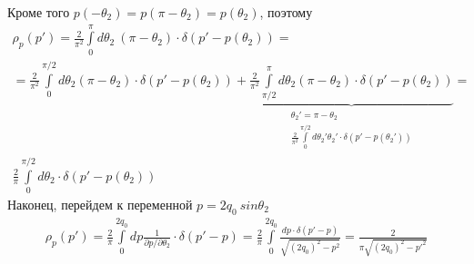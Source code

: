 \documentclass[12pt]{article}
\renewcommand{\l}{\left( }
\renewcommand{\r}{\right) }
\newcommand{\pd}{\partial}
\newcommand{\br}[1]{\l {#1} \r}
\begin{document}
Кроме того $p\br{-\theta_2} = p\br{\pi - \theta_2} = p\br{\theta_2}$, поэтому
\begin{gather}
\rho_p \br{p'} = \frac{2}{\pi^2} \int\limits_0^\pi d\theta_2 \ \br{\pi - \theta_2} \cdot \delta \br{p' - p \br{\theta_2}} = \nonumber \\
= \frac{2}{\pi^2} \int\limits_0^{\pi/2} d\theta_2 \br{\pi - \theta_2} \cdot \delta \br{p' - p \br{\theta_2}} + 
\underbrace{\frac{2}{\pi^2}\int\limits_{\pi/2}^\pi d\theta_2 \br{\pi - \theta_2} \cdot \delta \br{p' - p \br{\theta_2}} }_{
\begin{matrix}
\theta_2'=\pi - \theta_2 \\
\frac{2}{\pi^2}\int\limits_0^{\pi/2} d\theta_2' \theta_2' \cdot \delta \br{p' - p \br{\theta_2'}}
\end{matrix}
} = \\
\frac{2}{\pi} \int\limits_0^{\pi/2} d\theta_2 \cdot \delta \br{p' - p \br{\theta_2}}
\nonumber
\end{gather}
Наконец, перейдем к переменной $p = 2 q_0 \ sin \theta_2$
\begin{eqnarray}
\rho_p \br{p'} = \frac{2}{\pi} \int\limits_0^{2 q_0} dp \frac{1}{\pd p/\pd \theta_2} \cdot \delta \br{p' - p} = \frac{2}{\pi} \int\limits_0^{2 q_0} \frac{dp \cdot \delta \br{p' - p}}{\sqrt{\br{2 q_0}^2 -p^2}} = \frac{2}{\pi\sqrt{\br{2 q_0}^2 -p'^2}}
\end{eqnarray}
\end{document}
